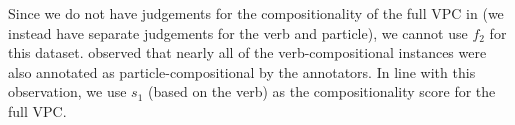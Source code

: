 \documentclass[output=paper,modfonts,nonflat]{langsci/langscibook}
\begin{document}
Since we do not have judgements for the compositionality of the full VPC
in \BANNARD (we instead have separate judgements for the verb and
particle), we cannot use $f_{2}$ for this dataset. \citet{bannard2003}
observed that nearly all of the verb-compositional instances were also
annotated as particle-compositional by the annotators. In line with this
observation, we use $s_1$ (based on the verb) as the compositionality
score for the full VPC.





\end{document}
